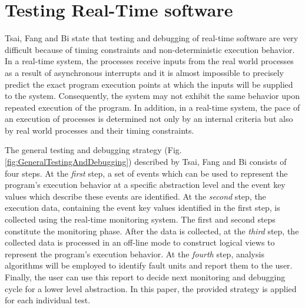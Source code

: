 

\section{Testing Real-Time software}
Tsai, Fang and Bi\cite{rtSandD} state that testing and debugging of real-time software are very difficult because of timing constraints and non-deterministic execution behavior. In a real-time system, the processes receive inputs from the real world processes as a result of asynchronous interrupts and it is almost impossible to precisely predict the exact program execution points at which the inputs will be supplied to the system. Consequently, the system may not exhibit the same behavior upon repeated execution of the program. In addition, in a real-time system, the pace of an execution of processes is determined not only by an internal criteria but also by real world processes and their timing constraints. 

The general testing and debugging strategy (Fig. \ref{fig:GeneralTestingAndDebugging}) described by Tsai, Fang and Bi \cite{rtSandD} consists of four steps.
At the \textit{first} step, a set of events which can be used to represent the program's execution behavior at a specific abstraction level and the event key values which describe these events are identified. 
At the \textit{second} step, the execution data, containing the event key values identified in the first step, is collected using the real-time monitoring system. 
The first and second steps constitute the monitoring phase. After the data is collected, at the \textit{third} step, the collected data is processed in an off-line mode to construct logical views to represent the program's execution behavior.
At the \textit{fourth} step, analysis algorithms will be employed to identify fault units and report them to the user. 
Finally, the user can use this report to decide next monitoring and debugging cycle for a lower level abstraction.
In this paper, the provided strategy is applied for each individual test.

